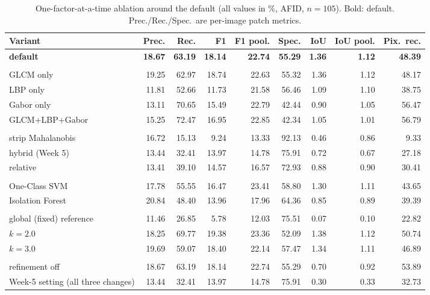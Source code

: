 \documentclass[11pt,a4paper]{article}
\begin{document}
\begin{table}[h]
\centering
\caption{One-factor-at-a-time ablation around the default (all values in \%, AFID, $n=105$). Bold: default. Prec./Rec./Spec.\ are per-image patch metrics.}
\label{tab:ablation}
\small
\setlength{\tabcolsep}{2.6pt}
\begin{tabularx}{\textwidth}{@{}lRRRRRRRR@{}}
\toprule
\textbf{Variant} & \textbf{Prec.} & \textbf{Rec.} & \textbf{F1} & \textbf{F1 pool.} & \textbf{Spec.} & \textbf{IoU} & \textbf{IoU pool.} & \textbf{Pix.\ rec.} \\
\midrule
\textbf{default} & \textbf{18.67} & \textbf{63.19} & \textbf{18.14} & \textbf{22.74} & \textbf{55.29} & \textbf{1.36} & \textbf{1.12} & \textbf{48.39} \\
\addlinespace
{} \\
GLCM only & 19.25 & 62.97 & 18.74 & 22.63 & 55.32 & 1.36 & 1.12 & 48.17 \\
LBP only & 11.81 & 52.66 & 11.73 & 21.58 & 56.46 & 1.09 & 1.10 & 38.75 \\
Gabor only & 13.11 & 70.65 & 15.49 & 22.79 & 42.44 & 0.90 & 1.05 & 56.47 \\
GLCM+LBP+Gabor & 15.25 & 72.47 & 16.95 & 22.85 & 42.34 & 1.05 & 1.01 & 56.79 \\
\addlinespace
{} \\
strip Mahalanobis & 16.72 & 15.13 & 9.24 & 13.33 & 92.13 & 0.46 & 0.86 & 9.33 \\
hybrid (Week 5) & 13.44 & 32.41 & 13.97 & 14.78 & 75.91 & 0.72 & 0.67 & 27.18 \\
relative & 13.41 & 39.10 & 14.57 & 16.57 & 72.93 & 0.88 & 0.90 & 30.41 \\
\addlinespace
{} \\
One-Class SVM & 17.78 & 55.55 & 16.47 & 23.41 & 58.80 & 1.30 & 1.11 & 43.65 \\
Isolation Forest & 20.84 & 48.40 & 13.96 & 17.96 & 64.36 & 0.85 & 0.89 & 39.39 \\
\addlinespace
{} \\
global (fixed) reference & 11.46 & 26.85 & 5.78 & 12.03 & 75.51 & 0.07 & 0.10 & 22.82 \\
$k=2.0$ & 18.25 & 69.77 & 19.38 & 23.36 & 52.09 & 1.38 & 1.12 & 50.74 \\
$k=3.0$ & 19.69 & 59.07 & 18.40 & 22.14 & 57.47 & 1.34 & 1.11 & 46.89 \\
\addlinespace
{} \\
refinement off & 18.67 & 63.19 & 18.14 & 22.74 & 55.29 & 0.70 & 0.92 & 53.89 \\
Week-5 setting (all three changes) & 13.44 & 32.41 & 13.97 & 14.78 & 75.91 & 0.30 & 0.33 & 32.73 \\
\bottomrule
\end{tabularx}
\end{table}
\end{document}
